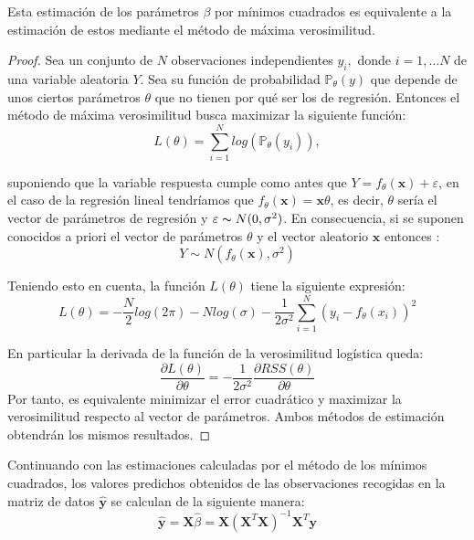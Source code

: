 \begin{propo}
Esta estimación de los parámetros $\beta$ por mínimos cuadrados es equivalente a la estimación de estos mediante el método de máxima verosimilitud.
\begin{proof}
Sea un conjunto de $N$ observaciones independientes $y_i, $ donde $i=1,\ldots N$ de una variable aleatoria $Y$. Sea su  función de probabilidad  $\mathbb{P}_\theta(y)$ que depende de unos ciertos parámetros $\theta$ que no tienen por qué ser los de regresión. Entonces el método de máxima verosimilitud busca maximizar la siguiente función:
\begin{equation}
L(\theta)=\sum_{i=1}^N log( \mathbb{P}_{\theta} (y_i)),
\end{equation}

\noindent suponiendo que la variable respuesta cumple como antes que  $Y=f_\theta (\textbf{x})+\varepsilon$, en el caso de la regresión lineal tendríamos que $f_\theta(\mathbf{x})=\mathbf{x}\theta$, es decir, $\theta$ sería el vector de parámetros de regresión y $\varepsilon \thicksim N(0,\sigma^2)$. En consecuencia, si se suponen conocidos a priori el vector de parámetros $\theta$ y el vector aleatorio $\textbf{x}$ entonces :
\begin{equation}
Y\sim N(f_\theta(\textbf{x}), \sigma^2)
\end{equation}

\noindent Teniendo esto en cuenta, la función $L(\theta)$ tiene la siguiente expresión:
\begin{equation}
L(\theta)=-\dfrac{N}{2}log(2\pi)-N log(\sigma)-\dfrac{1}{2\sigma^2}\sum_{i=1}^N (y_i-f_\theta(x_i))^2
\end{equation}

\noindent En particular la derivada de la función de la verosimilitud logística queda:
\begin{equation}
\dfrac{\partial L(\theta)}{\partial \theta}=-\dfrac{1}{2\sigma^2}\dfrac{\partial RSS(\theta)}{\partial \theta}
\end{equation}
\noindent Por tanto, es equivalente minimizar el error cuadrático y maximizar la verosimilitud respecto al vector de parámetros. Ambos métodos de estimación obtendrán los mismos resultados. 
\end{proof}
\end{propo}

\noindent Continuando con las estimaciones calculadas por el método de los mínimos cuadrados, los valores predichos obtenidos de las observaciones recogidas en la matriz de datos $\hat{\textbf{y}}$ se calculan de la siguiente manera:
\begin{equation}
\hat{\textbf{y}}=\textbf{X}\hat{\beta}=\textbf{X}(\textbf{X}^T\textbf{X})^{-1}\textbf{X}^T\textbf{y}
\end{equation}

